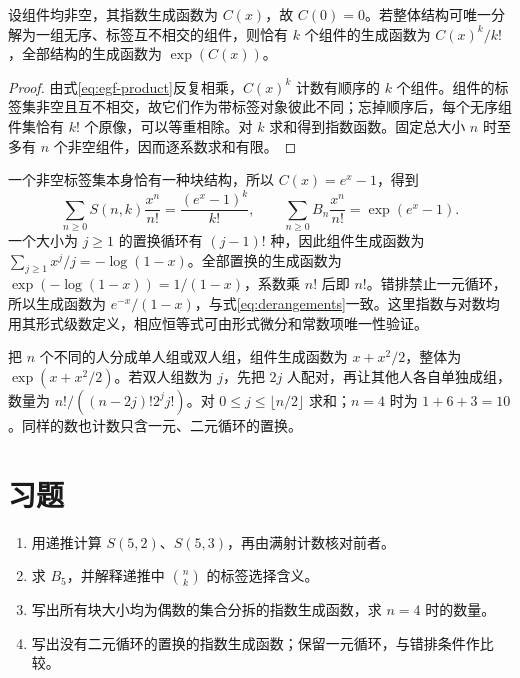 \documentclass[UTF8,12pt,a4paper,fontset=fandol]{ctexbook}
\begin{document}
\begin{theorem}[标号结构的指数公式]
设组件均非空，其指数生成函数为 $C(x)$，故 $C(0)=0$。若整体结构可唯一分解为一组无序、标签互不相交的组件，则恰有 $k$ 个组件的生成函数为 $C(x)^k/k!$，全部结构的生成函数为 $\exp(C(x))$。
\end{theorem}
\begin{proof}
由式\eqref{eq:egf-product}反复相乘，$C(x)^k$ 计数有顺序的 $k$ 个组件。组件的标签集非空且互不相交，故它们作为带标签对象彼此不同；忘掉顺序后，每个无序组件集恰有 $k!$ 个原像，可以等重相除。对 $k$ 求和得到指数函数。固定总大小 $n$ 时至多有 $n$ 个非空组件，因而逐系数求和有限。
\end{proof}

一个非空标签集本身恰有一种块结构，所以 $C(x)=e^x-1$，得到
\begin{equation}
 \sum_{n\ge0}S(n,k)\frac{x^n}{n!}=\frac{(e^x-1)^k}{k!},\qquad
 \sum_{n\ge0}B_n\frac{x^n}{n!}=\exp(e^x-1).
 \label{eq:stirling-bell-egf}
\end{equation}
一个大小为 $j\ge1$ 的置换循环有 $(j-1)!$ 种，因此组件生成函数为 $\sum_{j\ge1}x^j/j=-\log(1-x)$。全部置换的生成函数为 $\exp(-\log(1-x))=1/(1-x)$，系数乘 $n!$ 后即 $n!$。错排禁止一元循环，所以生成函数为 $e^{-x}/(1-x)$，与式\eqref{eq:derangements}一致。这里指数与对数均用其形式级数定义，相应恒等式可由形式微分和常数项唯一性验证。

\begin{example}[单人和配对]
把 $n$ 个不同的人分成单人组或双人组，组件生成函数为 $x+x^2/2$，整体为 $\exp(x+x^2/2)$。若双人组数为 $j$，先把 $2j$ 人配对，再让其他人各自单独成组，数量为 $n!/((n-2j)!2^jj!)$。对 $0\le j\le\lfloor n/2\rfloor$ 求和；$n=4$ 时为 $1+6+3=10$。同样的数也计数只含一元、二元循环的置换。
\end{example}

\section{习题}
\begin{enumerate}
  \item\label{ex:egf-1} 用递推计算 $S(5,2)$、$S(5,3)$，再由满射计数核对前者。
  \item\label{ex:egf-2} 求 $B_5$，并解释递推中 $\binom nk$ 的标签选择含义。
  \item\label{ex:egf-3} 写出所有块大小均为偶数的集合分拆的指数生成函数，求 $n=4$ 时的数量。
  \item\label{ex:egf-4} 写出没有二元循环的置换的指数生成函数；保留一元循环，与错排条件作比较。
\end{enumerate}
\end{document}
